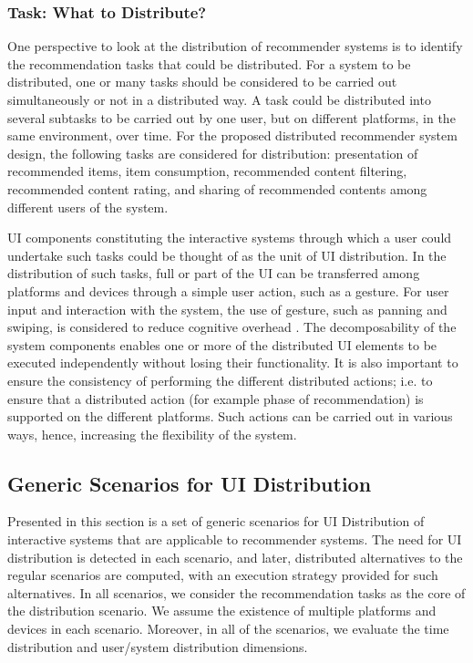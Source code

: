 \subsubsection{Task: What to Distribute?} 
One perspective to look at the distribution of recommender systems is to
identify the recommendation tasks that could be distributed. For a system to be distributed, one or many tasks should be considered to be carried out simultaneously or not in a distributed way. A task could be distributed into several subtasks to be carried out by one user, but on different platforms, in the same environment, over time.
For the proposed distributed recommender system design, the following tasks are
considered for distribution: presentation of recommended items, item
consumption, recommended content filtering, recommended content rating, and
sharing of recommended contents among different users of the system.\par
UI components constituting the interactive systems through which a user could
undertake such tasks could be thought of as the unit of UI distribution. In the
distribution of such tasks, full or part of the UI can be transferred among
platforms and devices through a simple user action, such as a gesture. For user
input and interaction with the system, the use of gesture, such as panning and
swiping, is considered to reduce cognitive overhead \cite{woerndl2012combining}.
The decomposability of the system components enables one or more of the distributed UI elements to be executed independently without losing their functionality.
It is also important to ensure the consistency of performing the different distributed actions; i.e. to ensure that a distributed action (for example phase of recommendation) is supported on the different platforms.
Such actions can be carried out in various ways, hence, increasing the flexibility of the system.

\subsection{Generic Scenarios for UI Distribution}
Presented in this section is a set of generic scenarios for UI Distribution of
interactive systems that are applicable to recommender systems. The need for UI
distribution is detected in each scenario, and later, distributed alternatives to the regular scenarios are computed, with an execution strategy provided for such alternatives. In all scenarios, we consider the recommendation tasks as the core of the distribution scenario. We assume the existence of multiple platforms and devices in each scenario. Moreover, in all of the scenarios, we evaluate the time distribution and user/system distribution dimensions.
  

